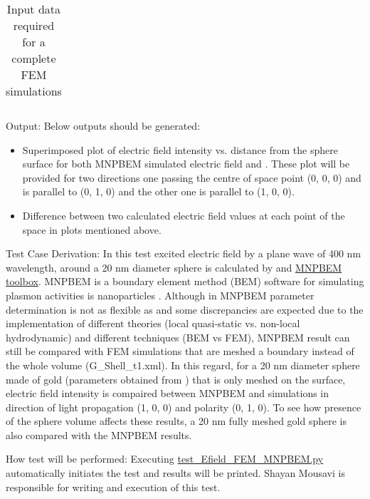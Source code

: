 \documentclass[12pt, titlepage]{article}
\begin{document}
\begin{enumerate}
\begin{table}
\begin{tabular}{|c|c|c|}
			\hline
		\end{tabular}
		\caption{Input data required for \progname{} a complete FEM simulations}
		\label{efield}
	\end{table}
	
	Output: Below outputs should be generated: 
	
	\begin{itemize}
		\item Superimposed plot of electric field intensity vs. distance from the sphere surface for both MNPBEM simulated electric field and \progname{}. These plot will be provided for two directions one passing the centre of space point (0, 0, 0) and is parallel to (0, 1, 0) and the other one is parallel to (1, 0, 0).
		
		\item  Difference between two calculated electric field values at each point of the space in plots mentioned above. 
		
    \end{itemize}	
	
	
	Test Case Derivation: In this test excited electric field by a plane wave of 400 nm wavelength, around a 20 nm diameter sphere is calculated by \progname{} and \href{https://physik.uni-graz.at/mnpbem/}{MNPBEM toolbox}. MNPBEM is a boundary element method (BEM) software for simulating plasmon activities is nanoparticles \citep{hohenester2012mnpbem}. Although in MNPBEM parameter determination is not as flexible as \progname{} and some discrepancies are expected due to the implementation of different theories (local quasi-static vs. non-local hydrodynamic) and different techniques (BEM vs FEM), MNPBEM result can still be compared with FEM simulations that are meshed a boundary instead of the whole volume (G\_Shell\_t1.xml). In this regard, for a 20 nm diameter sphere made of gold (parameters obtained from \cite{grady2004influence}) that is only meshed on the surface, electric field intensity is compaired between MNPBEM and \progname{} simulations in direction of light propagation (1, 0, 0) and polarity (0, 1, 0). 
	To see how presence of the sphere volume affects these results, a 20 nm fully meshed gold sphere is also compared with the MNPBEM results. 
		
	How test will be performed: Executing  \href{https://github.com/shmouses/SPDFM/tree/master/src/test_visual_ls.py}{test\_Efield\_FEM\_MNPBEM.py} automatically initiates the test and results will be printed. Shayan Mousavi is responsible for writing and execution of this test.   \\
		

\end{enumerate}
\end{document}
